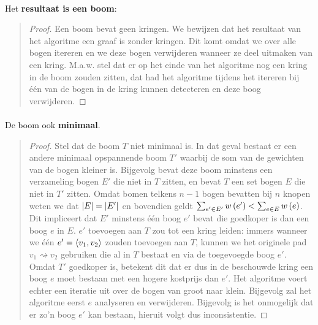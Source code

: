 \documentclass{article}
\begin{document}
\begin{question}
\begin{answer}
\paragraph{}
Het \textbf{resultaat is een boom}:
\begin{quote}\begin{proof}
Een boom bevat geen kringen. We bewijzen dat het resultaat van het algoritme een graaf is zonder kringen. Dit komt omdat we over alle bogen itereren en we deze bogen verwijderen wanneer ze deel uitmaken van een kring. M.a.w. stel dat er op het einde van het algoritme nog een kring in de boom zouden zitten, dat had het algoritme tijdens het itereren bij \'e\'en van de bogen in de kring kunnen detecteren en deze boog verwijderen.
\end{proof}\end{quote}
\paragraph{}
De boom ook \textbf{minimaal}.
\begin{quote}\begin{proof}
Stel dat de boom $T$ niet minimaal is. In dat geval bestaat er een andere minimaal opspannende boom  $T'$ waarbij de som van de gewichten van de bogen kleiner is.
Bijgevolg bevat deze boom minstens een verzameling bogen $E'$ die niet in $T$ zitten, en bevat $T$ een set bogen $E$ die niet in $T'$ zitten. Omdat bomen telkens $n-1$
bogen bevatten bij $n$ knopen weten we dat $\left|E\right|=\left|E'\right|$ en bovendien geldt $\sum_{e'\in E'}w\left( e' \right)<\sum_{e\in E}w\left( e \right)$. Dit impliceert dat
$E'$ minstens \'e\'en boog $e'$ bevat die goedkoper is dan een boog $e$ in $E$. $e'$ toevoegen aan $T$ zou tot een kring leiden: immers wanneer we \'e\'en
$e'=\left\langle v_1,v_2 \right\rangle$ zouden toevoegen aan $T$, kunnen we het originele pad $v_1\rightsquigarrow v_2$ gebruiken die al in $T$ bestaat en via de toegevoegde
boog $e'$. Omdat $T'$ goedkoper is, betekent dit dat er dus in de beschouwde kring een boog $e$ moet bestaan met een hogere kostprijs dan $e'$.
Het algoritme voert echter een iteratie uit over de bogen van groot naar klein. Bijgevolg zal het algoritme eerst $e$ analyseren en verwijderen.
Bijgevolg is het onmogelijk dat er zo'n boog $e'$ kan bestaan, hieruit volgt dus inconsistentie.
\end{proof}\end{quote}
\end{answer}
\end{question}
\end{document}

